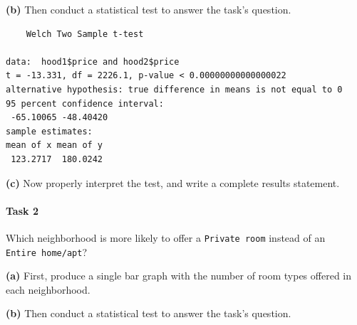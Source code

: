 \documentclass[
]{book}
\newenvironment{Shaded}{\begin{snugshade}}{\end{snugshade}}
\newcommand{\FunctionTok}[1]{\textcolor[rgb]{0.00,0.00,0.00}{#1}}
\newcommand{\NormalTok}[1]{#1}
\newcommand{\SpecialCharTok}[1]{\textcolor[rgb]{0.00,0.00,0.00}{#1}}
\begin{document}
\textbf{(b)} Then conduct a statistical test to answer the task's question.

\begin{Shaded}
\end{Shaded}

\begin{verbatim}
    Welch Two Sample t-test

data:  hood1$price and hood2$price
t = -13.331, df = 2226.1, p-value < 0.00000000000000022
alternative hypothesis: true difference in means is not equal to 0
95 percent confidence interval:
 -65.10065 -48.40420
sample estimates:
mean of x mean of y 
 123.2717  180.0242 
\end{verbatim}

\textbf{(c)} Now properly interpret the test, and write a complete results statement.

\hypertarget{task-2-1}{%
\paragraph*{Task 2}\label{task-2-1}}

Which neighborhood is more likely to offer a \texttt{Private\ room} instead of an \texttt{Entire\ home/apt}?

\textbf{(a)} First, produce a single bar graph with the number of room types offered in each neighborhood.

\textbf{(b)} Then conduct a statistical test to answer the task's question.
\end{document}

